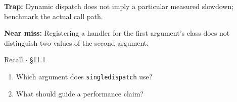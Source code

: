 \documentclass[11pt]{article}
\begin{document}
\begin{keepsection}
\begin{notebox}\textbf{Trap:} Dynamic dispatch does not imply a particular measured slowdown; benchmark the actual call path.\end{notebox}

\begin{notebox}\textbf{Near miss:} Registering a handler for the first argument’s class does not distinguish two values of the second argument.\end{notebox}

\begin{recallbox}{Recall \ensuremath{\cdot} §11.1}
\begin{enumerate}
\item Which argument does \texttt{singledispatch} use?
\item What should guide a performance claim?
\end{enumerate}

\end{recallbox}
\end{keepsection}
\end{document}
